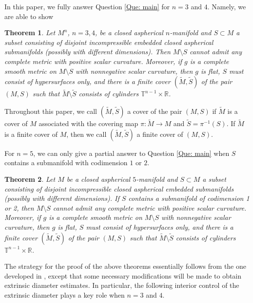 \documentclass[11pt, reqno]{amsart}
\numberwithin{equation}{section}
\newtheorem{theorem}{Theorem}[section]
\theoremstyle{definition}
\begin{document}
In this paper, we fully answer Question \ref{Que: main} for $n=3$ and $4$. Namely, we are able to show

\begin{theorem}\label{Thm: main}
Let $M^n$, $n=3,4$, be a closed aspherical $n$-manifold and $S\subset M$ a subset consisting of disjoint incompressible embedded closed aspherical  submanifolds (possibly with different dimensions). Then $M\setminus S$ cannot admit any complete metric with positive scalar curvature. Moreover, if $g$ is a complete smooth metric on $M\setminus S$ with nonnegative scalar curvature, then $g$ is flat, $S$ must consist of hypersurfaces only, and there is a finite cover $(\tilde M,\tilde S)$ of the pair $(M,S)$ such that $\tilde M\setminus \tilde S$ consists of cylinders $\mathbb T^{n-1}\times \mathbb R$.
\end{theorem}

Throughout this paper, we call $(\tilde M,\tilde S)$ a cover of the pair $(M,S)$ if $\tilde M$ is a cover of $M$ associated with the covering map $\pi:\tilde M\to M$ and $\tilde S=\pi^{-1}(S)$. If $\tilde M$ is a finite cover of $M$, then we call $(\tilde M,\tilde S)$ a finite cover of $(M,S)$.

For $n=5$, we can only give a partial answer to Question \ref{Que: main} when $S$ contains a submanifold with codimension $1$ or $2$.

\begin{theorem}\label{Thm: 5d}
Let $M$ be a closed aspherical $5$-manifold and $S\subset M$ a subset consisting of disjoint incompressible closed aspherical embedded submanifolds (possibly with different dimensions).
If $S$ contains a submanifold of codimension 1 or 2, then $M\setminus S$ cannot admit any complete metric with positive scalar curvature. Moreover, if $g$ is a complete smooth metric on $M\setminus S$ with nonnegative scalar curvature, then $g$ is flat, $S$ must consist of hypersurfaces only, and there is a finite cover $(\tilde M,\tilde S)$ of the pair $(M,S)$ such that $\tilde M\setminus \tilde S$ consists of cylinders $\mathbb T^{n-1}\times \mathbb R$.
\end{theorem}
The strategy for the proof of the above theorems essentially follows from the one developed in \cite{CCZ23}, except that some necessary modifications will be made to obtain extrinsic diameter estimates. In particular, the following interior control of the extrinsic diameter plays a key role when $n=3$ and $4$. 
\end{document}
